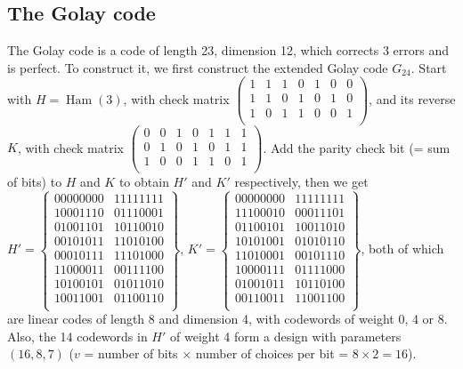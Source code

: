 \documentclass[12pt]{article}
\newcommand{\Ham}[1]{\operatorname{Ham}(#1)}
\begin{document}
\subsection{The Golay code}

The Golay code is a code of length 23, dimension 12, which corrects 3 errors and is perfect. To construct it, we first construct the extended Golay code $G_{24}$. Start with $H = \Ham{3}$, with check matrix $\begin{pmatrix}
1 & 1 & 1 & 0 & 1 & 0 & 0 \\
1 & 1 & 0 & 1 & 0 & 1 & 0 \\
1 & 0 & 1 & 1 & 0 & 0 & 1 \\
\end{pmatrix}$, and its reverse $K$, with check matrix $\begin{pmatrix}
0 & 0 & 1 & 0 & 1 & 1 & 1 \\
0 & 1 & 0 & 1 & 0 & 1 & 1 \\
1 & 0 & 0 & 1 & 1 & 0 & 1 \\
\end{pmatrix}$. Add the parity check bit (= sum of bits) to $H$ and $K$ to obtain $H'$ and $K'$ respectively, then we get $H' = \begin{Bmatrix}
00000000 & 11111111 \\
10001110 & 01110001 \\
01001101 & 10110010 \\
00101011 & 11010100 \\
00010111 & 11101000 \\
11000011 & 00111100 \\
10100101 & 01011010 \\
10011001 & 01100110 \\
\end{Bmatrix}$, $K' = \begin{Bmatrix}
00000000 & 11111111 \\
11100010 & 00011101 \\
01100101 & 10011010 \\
10101001 & 01010110 \\
11010001 & 00101110 \\
10000111 & 01111000 \\
01001011 & 10110100 \\
00110011 & 11001100 \\
\end{Bmatrix}$, both of which are linear codes of length 8 and dimension 4, with codewords of weight 0, 4 or 8. Also, the 14 codewords in $H'$ of weight 4 form a design with parameters $(16, 8, 7)$ ($v$ = number of bits $\times$ number of choices per bit = $8 \times 2 = 16$).
\end{document}
